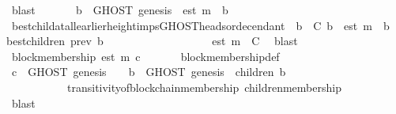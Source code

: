 \begin{isabellebody}
\ blast\isanewline
\ \ \ \ \isamarkupfalse%
\ {\isachardoublequoteopen}{\isasymforall}\ b{\isacharprime}{\isacharprime}\ {\isasymin}\ GHOST\ {\isacharparenleft}{\isacharbraceleft}genesis{\isacharbraceright}{\isacharcomma}\ {\isasymsigma}{\isacharprime}{\isacharparenright}{\isachardot}\ est\ m\ {\isasymdownharpoonright}\ b{\isacharprime}{\isacharprime}{\isachardoublequoteclose}\isanewline
\ \ \ \ \ \ \isamarkupfalse%
\ best{\isacharunderscore}child{\isacharunderscore}at{\isacharunderscore}all{\isacharunderscore}earlier{\isacharunderscore}height{\isacharunderscore}imps{\isacharunderscore}GHOST{\isacharunderscore}heads{\isacharunderscore}or{\isacharunderscore}decendant\ {\isacartoucheopen}{\isasymforall}\ b{\isacharprime}\ {\isasymin}\ C{\isachardot}\ b{\isacharprime}\ {\isasymdownharpoonright}\ est\ m\ {\isasymlongrightarrow}\ b{\isacharprime}\ {\isasymin}\ best{\isacharunderscore}children\ {\isacharparenleft}prev\ b{\isacharprime}{\isacharcomma}\ {\isasymsigma}{\isacharprime}{\isacharparenright}{\isacartoucheclose}\isanewline
\ \ \ \ \ \ \ \ \ \ \ \ {\isacartoucheopen}{\isasymsigma}\ {\isasymin}\ {\isasymSigma}{\isacartoucheclose}\ {\isacartoucheopen}{\isasymsigma}{\isacharprime}\ {\isasymin}\ {\isasymSigma}{\isacartoucheclose}\ {\isacartoucheopen}est\ m\ {\isasymin}\ C{\isacartoucheclose}\ \isamarkupfalse%
\ blast\ \isanewline
\ \ \ \isamarkupfalse%
\ \isamarkupfalse%
\ {\isachardoublequoteopen}block{\isacharunderscore}membership\ {\isacharparenleft}est\ m{\isacharparenright}\ c{\isachardoublequoteclose}\isanewline
\ \ \ \ \ \isamarkupfalse%
\ block{\isacharunderscore}membership{\isacharunderscore}def\isanewline
\ \ \ \ \ \isamarkupfalse%
\ {\isacartoucheopen}c\ {\isasymin}\ GHOST\ {\isacharparenleft}{\isacharbraceleft}genesis{\isacharbraceright}{\isacharcomma}\ {\isasymsigma}{\isacharprime}{\isacharparenright}\ {\isasymunion}\ {\isacharparenleft}{\isasymUnion}\ b\ {\isasymin}\ GHOST\ {\isacharparenleft}{\isacharbraceleft}genesis{\isacharbraceright}{\isacharcomma}\ {\isasymsigma}{\isacharprime}{\isacharparenright}{\isachardot}\ children\ {\isacharparenleft}b{\isacharcomma}\ {\isasymsigma}{\isacharprime}{\isacharparenright}{\isacharparenright}{\isacartoucheclose}\ \ \isanewline
\ \ \ \ \ \ \ \ \ \ \ transitivity{\isacharunderscore}of{\isacharunderscore}blockchain{\isacharunderscore}membership\ children{\isacharunderscore}membership\isanewline
\ \ \ \ \ \isamarkupfalse%
\ blast\isanewline
\ \isamarkupfalse%
\isanewline
{}\isamarkupfalse%
%
\endisatagproof
{\isafoldproof}%
%
\isadelimproof
\isanewline
%
\endisadelimproof
%
\isadelimtheory
\isanewline
%
\endisadelimtheory
%
\isatagtheory
{}\isamarkupfalse%
%
\endisatagtheory
{\isafoldtheory}%
%
\isadelimtheory
%
\endisadelimtheory
%
\end{isabellebody}%
